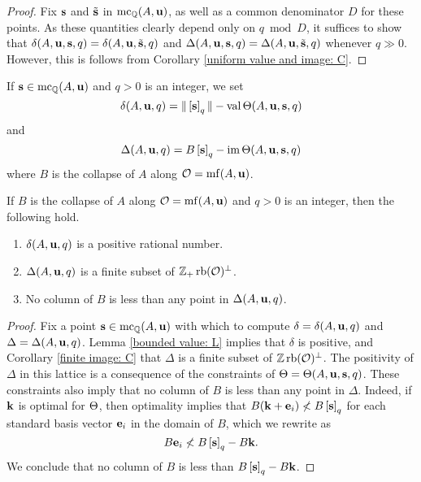 \documentclass[11pt]{amsart}
\renewcommand{\!}[1]{{\color{red}\text{$\star$\,}#1\,$\star$}}
\begin{document}
\begin{proof}
Fix $\mathbf{s}$ and $\tilde{\mathbf{s}}$ in $\operatorname{mc}_{\mathbb{Q}}(A, \mathbf{u})$, as well as a common denominator $D$ for these points.  As these quantities clearly depend only on $q \bmod D$, it suffices to show that $\delta(A, \mathbf{u}, \mathbf{s}, q) = \delta(A, \mathbf{u}, \tilde{\mathbf{s}}, q)$  and $ \Delta(A, \mathbf{u}, \mathbf{s}, q) = \Delta(A, \mathbf{u}, \tilde{\mathbf{s}}, q)$ whenever $q \gg 0$.  However, this is follows from Corollary \ref{uniform value and image: C}.
\end{proof}



\begin{definition}  
\label{independence: D}  
If $\mathbf{s} \in \operatorname{mc}_{\mathbb{Q}}(A, \mathbf{u})$ and $q>0$ is an integer, we set \[ \delta(A, \mathbf{u}, q) = \| \left[ \mathbf{s} \right]_q \|  - \operatorname{val} \Theta(A, \mathbf{u}, \mathbf{s}, q)\] and 
\[\Delta(A, \mathbf{u}, q) = B \left[ \mathbf{s} \right]_q - \operatorname{im}  \Theta( A, \mathbf{u}, \mathbf{s}, q)  \]
where $B$ is the collapse of $A$ along $\mathcal{O} = \operatorname{mf}(A, \mathbf{u})$. 
\end{definition}


\begin{lemma}  
\label{independence: L}  
If $B$ is the collapse of $A$ along $\mathcal{O} = \operatorname{mf}(A, \mathbf{u})$ and $q>0$ is an integer, then the following hold.

\begin{enumerate}
\item $\delta(A, \mathbf{u}, q)$  is a positive rational number.
\item $\Delta(A, \mathbf{u}, q)$ is a finite subset of $\mathbb{Z}_+\operatorname{rb}(\mathcal{O})^{\perp}$.
\item No column of $B$ is less than any point in $\Delta(A, \mathbf{u}, q)$.
\end{enumerate}
\end{lemma}

\begin{proof} 
Fix a point $\mathbf{s} \in \operatorname{mc}_{\mathbb{Q}}(A, \mathbf{u})$ with which to compute $\delta = \delta(A, \mathbf{u}, q)$ and $\Delta = \Delta(A, \mathbf{u}, q)$.  Lemma \ref{bounded value: L} implies that $\delta$ is positive, and Corollary \ref{finite image: C} that $\Delta$ is a finite subset of $\mathbb{Z} \operatorname{rb}(\mathcal{O})^{\perp}$.   The positivity of $\Delta$ in this lattice is a consequence of the constraints of $\Theta = \Theta(A, \mathbf{u}, \mathbf{s}, q)$.  These constraints also imply that no column of $B$ is less than any point in $\Delta$.  Indeed, if $\mathbf{k}$ is optimal for $\Theta$, then optimality implies that  $B( \mathbf{k} + \mathbf{e}_i) \not < B \left[ \mathbf{s} \right]_q$ for each standard basis vector $\mathbf{e}_i$ in the domain of $B$, which we rewrite as  \[ B \mathbf{e}_i \not < B \left[ \mathbf{s} \right]_q - B \mathbf{k}.\] 
We conclude that no column of $B$ is less than $B\left[ \mathbf{s} \right]_q - B\mathbf{k}$.
\end{proof}
\end{document}
